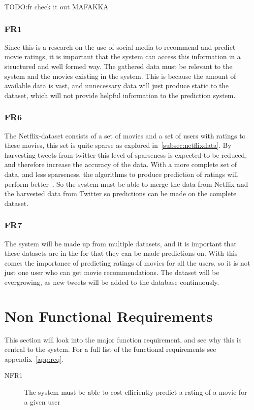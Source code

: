 TODO:fr check it out MAFAKKA
\subsubsection{FR1}
Since this is a research on the use of social media to recommend and predict movie ratings, it is important that the system can access this information in a structured and well formed way. The gathered data must be relevant to the system and the movies existing in the system. This is because the amount of available data is vast, and unnecessary data will just produce static to the dataset, which will not provide helpful information to the prediction system.

\subsubsection{FR6}
The Netflix-dataset consists of a set of movies and a set of users with ratings to these movies, this set is quite sparse as explored in~\ref{subsec:netflixdata}. By harvesting tweets from twitter this level of sparseness is expected to be reduced, and therefore increase the accuracy of the data. With a more complete set of data, and less sparseness, the algorithms to produce prediction of ratings will perform better~\cite{grobelnikDataSparsityIssues}. So the system must be able to merge the data from Netflix and the harvested data from Twitter so predictions can be made on the complete dataset.

\subsubsection{FR7}
The system will be made up from multiple datasets, and it is important that these datasets are in the for that they can be made predictions on. With this comes the importance of predicting ratings of movies for all the users, so it is not just one user who can get movie recommendations. The dataset will be evergrowing, as new tweets will be added to the database continuously.

\section{Non Functional Requirements}\label{section:non-functional-requirements}
This section will look into the major function requirement, and see why this is central to the system. For a full list of the functional requirements see appendix~\ref{app:req}.
\begin{description}
  \item[NFR1] The system must be able to cost efficiently predict a rating of a movie for a given user
\end{description}


